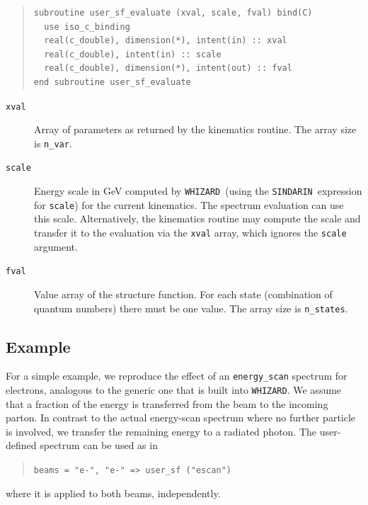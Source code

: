 \documentclass[12pt]{book}
\newcommand{\ttt}[1]{\texttt{#1}}
\newcommand{\whizard}{\texttt{WHIZARD}}
\newcommand{\sindarin}{\texttt{SINDARIN}}
\begin{document}
\begin{enumerate}
\begin{quote}
  \begin{footnotesize}
\begin{verbatim}
subroutine user_sf_evaluate (xval, scale, fval) bind(C)
  use iso_c_binding
  real(c_double), dimension(*), intent(in) :: xval
  real(c_double), intent(in) :: scale
  real(c_double), dimension(*), intent(out) :: fval
end subroutine user_sf_evaluate
\end{verbatim}
  \end{footnotesize}
  \end{quote}
  \begin{description}
  \item[\ttt{xval}]  Array of parameters as returned by the kinematics
    routine.  The array size is \ttt{n\_var}.
  \item[\ttt{scale}]  Energy scale in GeV computed by \whizard\ (using
    the \sindarin\ expression for \ttt{scale}) for the current
    kinematics.  The spectrum evaluation can use this
    scale.  Alternatively, the kinematics routine may compute the scale
    and transfer it to the evaluation via the \ttt{xval} array, which
    ignores the \ttt{scale} argument.
  \item[\ttt{fval}]  Value array of the structure function.  For each
    state (combination of quantum numbers) there must be one value.
    The array size is \ttt{n\_states}.
  \end{description}
\end{enumerate}


\subsection{Example}

For a simple example, we reproduce the effect of an
\ttt{energy\_scan} spectrum for electrons, analogous to the generic
one that is built into \whizard.  We assume
that a fraction of the energy is transferred from the beam to the
incoming parton.  In contrast to the actual energy-scan spectrum where
no further particle is involved, we transfer the remaining energy to a
radiated photon.  The user-defined spectrum can be used as in
\begin{quote}
\begin{footnotesize}
  \ttt{beams = "e-", "e-" => user\_sf ("escan")}
\end{footnotesize}
\end{quote}
where it is applied to both beams, independently.
\end{document}
